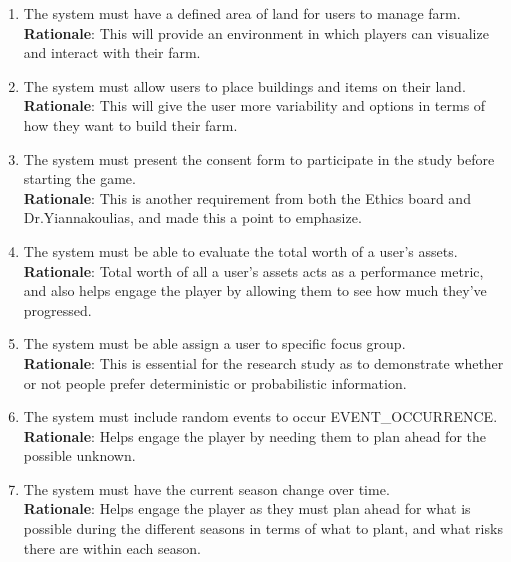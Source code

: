 \documentclass{article}
\begin{document}
\begin{enumerate}[{FR}1. ]
  \item The system must have a defined area of land for users to manage farm.\\
  \textbf{Rationale}: This will provide an environment in which players can visualize and interact with their farm.
  \item The system must allow users to place buildings and items on their land.\\
  \textbf{Rationale}: This will give the user more variability and options in terms of how they want to build their farm.
  \item \label{FR18} The system must present the consent form to participate in the study before starting the game.\\
  \textbf{Rationale}: This is another requirement from both the Ethics board and Dr.Yiannakoulias, and made this a point to emphasize.
  \item The system must be able to evaluate the total worth of a user's assets.
  \textbf{Rationale}: Total worth of all a user's assets acts as a performance metric, and also helps engage the player by allowing them to see how much they've progressed.
  \item The system must be able assign a user to specific focus group.\\
  \textbf{Rationale}: This is essential for the research study as to demonstrate whether or not people prefer deterministic or probabilistic information.
  \item The system must include random events to occur EVENT\_OCCURRENCE.\\
  \textbf{Rationale}: Helps engage the player by needing them to plan ahead for the possible unknown.
  \item The system must have the current season change over time.\\
  \textbf{Rationale}: Helps engage the player as they must plan ahead for what is possible during the different seasons in terms of what to plant, and what risks there are within each season.
\end{enumerate}
\end{document}
